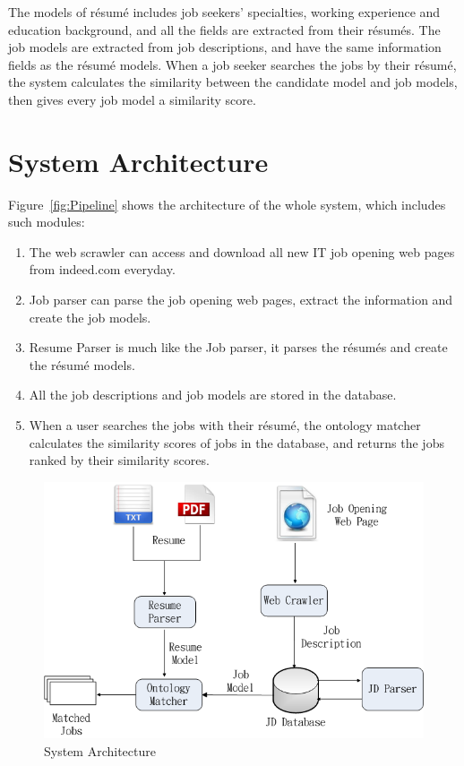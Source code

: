 The models of r\'esum\'e includes job seekers' specialties, working experience and education background, and all the fields are extracted from their r\'esum\'es. The job models are extracted from job descriptions, and have the same information fields as the r\'esum\'e models.  When a job seeker searches the jobs by their r\'esum\'e, the system calculates the similarity between the candidate model and job models, then gives every job model a similarity score.

\section{System Architecture}

Figure~\ref{fig:Pipeline} shows the architecture of the whole system, which includes such modules:

\begin{enumerate}
    \item The web scrawler can access and download all new IT job opening web pages from indeed.com everyday.
    \item Job parser can parse the job opening web pages, extract the information and create the job models.
    \item Resume Parser is much like the Job parser, it parses the r\'esum\'es and create the r\'esum\'e models.
    \item All the job descriptions and job models are stored in the database.
    \item When a user searches  the jobs with their r\'esum\'e, the ontology matcher calculates the similarity scores of jobs in the database, and returns the jobs ranked by their similarity scores.
\end{enumerate}

\begin{figure}[htbp]
  \centering
  \includegraphics[scale=0.5]{images/arch.png}
  \caption{System Architecture}
  \label{fig:arch}
\end{figure}

